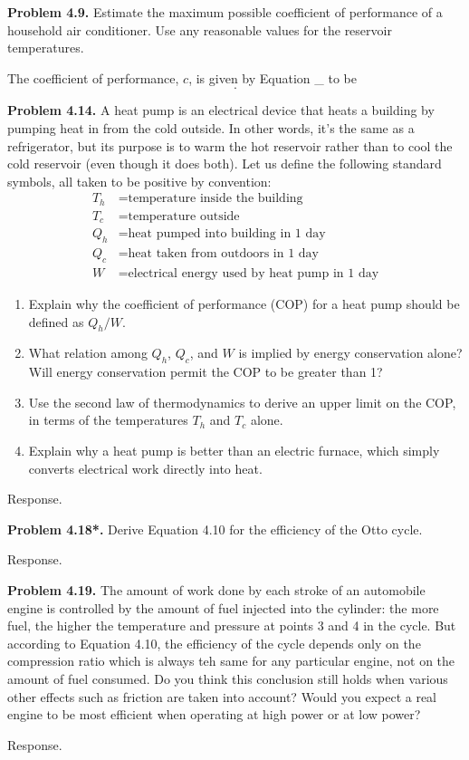 \documentclass[a4paper, 12pt]{config/homework}
\begin{document}
\pagebreak
\noindent
\textbf{Problem 4.9.} Estimate the maximum possible coefficient of performance of a household air conditioner. Use any reasonable values for the reservoir temperatures.

\noindent
The coefficient of performance, \(c\), is given by Equation \_ to be
\[ .\]

\pagebreak
\noindent
\textbf{Problem 4.14.} A heat pump is an electrical device that heats a building by pumping heat in from the cold outside. In other words, it's the same as a refrigerator, but its purpose is to warm the hot reservoir rather than to cool the cold reservoir (even though it does both). Let us define the following standard symbols, all taken to be positive by convention:
\begin{align*}
   T_h &= \text{temperature inside the building}
\\ T_c &= \text{temperature outside}
\\ Q_h &= \text{heat pumped into building in 1 day}
\\ Q_c &= \text{heat taken from outdoors in 1 day}
\\ W   &= \text{electrical energy used by heat pump in 1 day}
\end{align*}
\begin{enumerate}[label=\textbf{(\alph*)}]
\item Explain why the coefficient of performance (COP) for a heat pump should be defined as \(Q_h/W\).
\item What relation among \(Q_h\), \(Q_c\), and \(W\) is implied by energy conservation alone? Will energy conservation permit the COP to be greater than 1?
\item Use the second law of thermodynamics to derive an upper limit on the COP, in terms of the temperatures \(T_h\) and \(T_c\) alone.
\item Explain why a heat pump is better than an electric furnace, which simply converts electrical work directly into heat.
\end{enumerate}
\noindent
Response.

\pagebreak
\noindent
\textbf{Problem 4.18*.} Derive Equation 4.10 for the efficiency of the Otto cycle.

\noindent
Response.

\pagebreak
\noindent
\textbf{Problem 4.19.} The amount of work done by each stroke of an automobile engine is controlled by the amount of fuel injected into the cylinder: the more fuel, the higher the temperature and pressure at points 3 and 4 in the cycle. But according to Equation 4.10, the efficiency of the cycle depends only on the compression ratio which is always teh same for any particular engine, not on the amount of fuel consumed. Do you think this conclusion still holds when various other effects such as friction are taken into account? Would you expect a real engine to be most efficient when operating at high power or at low power?

\noindent
Response.
\end{document}
